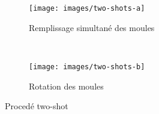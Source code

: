 \documentclass[a4paper]{paper}
\begin{document}

\tableofcontents

\clearpage




\begin{figure}
        \centering
        \begin{subfigure}[b]{0.4\textwidth}
                \texttt{[image: images/two-shots-a]}
                \caption{Remplissage simultané des moules}
        \end{subfigure}%
        ~ 
        \begin{subfigure}[b]{0.4\textwidth}
                \texttt{[image: images/two-shots-b]}
                \caption{Rotation des moules}
        \end{subfigure}%
        \caption{Procedé two-shot}\label{fig:animals}

\end{figure}

\appendix

\clearpage

\nocite{*} %


\end{document}
